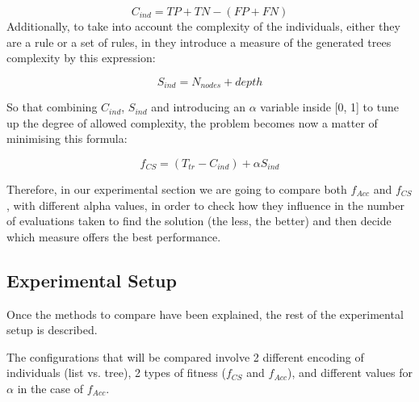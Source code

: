 \documentclass[a4paper,10pt,twocolumn,preprint,3p]{elsarticle}
\begin{document}
\begin{equation}
\label{eq:coverage}
C_{ind} = TP + TN - (FP + FN)
\end{equation}
Additionally, to take into account the complexity of the individuals,
either they are a rule or a set of rules, in \cite{witten2005data}
they introduce a measure of the generated trees complexity by this
expression: 

\begin{equation}
S_{ind} = N_{nodes} + depth
\end{equation}

So that combining $C_{ind}$, $S_{ind}$ and introducing an $\alpha$ variable inside [0, 1] to tune up the degree of allowed complexity, the problem becomes now a matter of minimising this formula:

\begin{equation}
\label{eq:complexFitness}
f_{CS} = (T_{tr} - C_{ind}) + \alpha S_{ind}
\end{equation}

Therefore, in our experimental section we are going to compare both
$f_{Acc}$ and $f_{CS}$, with different  alpha values, in order
to check how they influence in the number of evaluations taken to find the solution (the less, the better) 
and then decide which measure offers the best performance. %


\subsection{Experimental Setup}
\label{sec:experiments}

Once the methods to compare have been explained, the rest of the experimental setup is described.

The configurations that will be compared involve 2 different encoding of individuals (list vs. tree), 2 types of fitness ($f_{CS}$ and $f_{Acc}$), and different values for $\alpha$ in the case of $f_{Acc}$.
\end{document}
